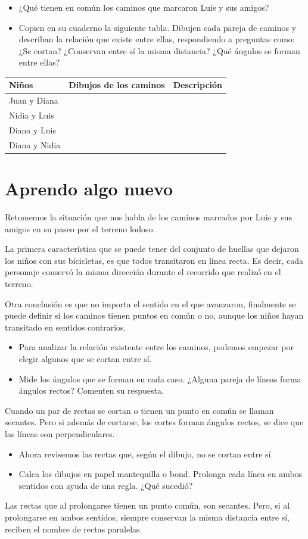 \documentclass[twoside]{article}
\begin{document}
\begin{itemize}
\item ¿Qué tienen en común los caminos que marcaron Luis y sus amigos?
\item Copien en su cuaderno la siguiente tabla. Dibujen cada pareja de caminos y describan la relación que existe entre ellas, respondiendo a preguntas como:¿Se cortan? ¿Conservan entre sí la misma distancia? ¿Qué ángulos se forman entre ellas?
\end{itemize}
\begin{center}
 \begin{tabular}{|l|c|c|}
\hline 
\hspace{20pt} Niños & Dibujos de los caminos & Descripción \\ 
\hline 
Juan y Diana &  &  \\ 
\hline
Nidia y Luis &  &  \\ 
\hline 
Diana y Luis &  &  \\ 
\hline 
Diana y Nidia &  &  \\ 
\hline 
\end{tabular}
 \end{center} 
\section*{Aprendo algo nuevo}
Retomemos la situación que nos habla de los caminos marcados por Luis y sus amigos en su paseo por el terreno lodoso.

La primera característica que se puede tener del conjunto
de huellas que dejaron los niños con sus bicicletas, es que
todos transitaron en línea recta. Es decir, cada personaje conservó la misma dirección durante el recorrido que realizó en
el terreno.

Otra conclusión es que no importa el sentido en el que
avanzaron, finalmente se puede definir si los caminos tienen
puntos en común o no, aunque los niños hayan transitado en
sentidos contrarios.
\begin{itemize}
\item Para analizar la relación existente entre los caminos, podemos empezar por elegir algunos que se cortan entre sí.
\item Mide los ángulos que se forman en cada caso. ¿Alguna pareja de líneas forma ángulos rectos? Comenten su respuesta.
\end{itemize}
Cuando un par de rectas se cortan o tienen un punto en
común se llaman secantes. Pero si además de cortarse, los cortes forman ángulos rectos, se dice que las líneas son perpendiculares.
\begin{itemize}
\item Ahora revisemos las rectas que, según el dibujo, no se cortan entre sí.
\item Calca los dibujos en papel mantequilla o bond. Prolonga cada línea en ambos sentidos con ayuda de una regla. ¿Qué sucedió?
\end{itemize}
Las rectas que al prolongarse tienen un punto común, son secantes. Pero, si al prolongarse en ambos sentidos, siempre conservan la misma distancia entre sí, reciben el nombre de rectas paralelas.
\end{document}
